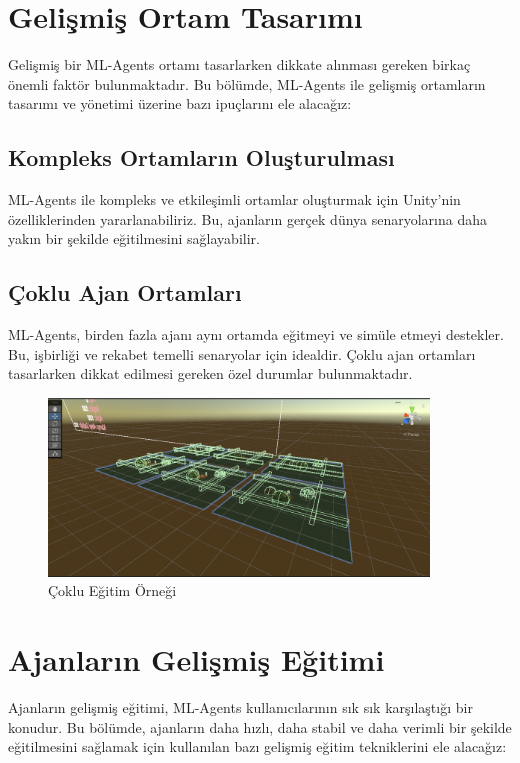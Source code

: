 \documentclass{article}
\begin{document}
\section{Gelişmiş Ortam Tasarımı}
    Gelişmiş bir ML-Agents ortamı tasarlarken dikkate alınması gereken birkaç önemli faktör bulunmaktadır. Bu bölümde, ML-Agents ile gelişmiş ortamların tasarımı ve yönetimi üzerine bazı ipuçlarını ele alacağız:

    \subsection{Kompleks Ortamların Oluşturulması}
        ML-Agents ile kompleks ve etkileşimli ortamlar oluşturmak için Unity'nin özelliklerinden yararlanabiliriz. Bu, ajanların gerçek dünya senaryolarına daha yakın bir şekilde eğitilmesini sağlayabilir.

    \subsection{Çoklu Ajan Ortamları}
        ML-Agents, birden fazla ajanı aynı ortamda eğitmeyi ve simüle etmeyi destekler. Bu, işbirliği ve rekabet temelli senaryolar için idealdir. Çoklu ajan ortamları tasarlarken dikkat edilmesi gereken özel durumlar bulunmaktadır.
        \begin{figure}[h]
    \centering
    \includegraphics[width=0.9\textwidth]{genelgorunum.PNG}
    \caption{Çoklu Eğitim Örneği}
    \label{fig:resim16}
\end{figure}

    
\section{Ajanların Gelişmiş Eğitimi}
    Ajanların gelişmiş eğitimi, ML-Agents kullanıcılarının sık sık karşılaştığı bir konudur. Bu bölümde, ajanların daha hızlı, daha stabil ve daha verimli bir şekilde eğitilmesini sağlamak için kullanılan bazı gelişmiş eğitim tekniklerini ele alacağız:
\end{document}
